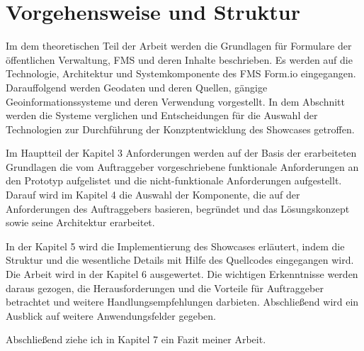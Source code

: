 \section{Vorgehensweise und Struktur}
Im dem theoretischen Teil der Arbeit werden die Grundlagen für Formulare der öffentlichen Verwaltung, FMS und deren Inhalte beschrieben. Es werden auf die Technologie, Architektur und Systemkomponente des FMS Form.io eingegangen. Darauffolgend werden Geodaten und deren Quellen, gängige Geoinformationssysteme und deren Verwendung vorgestellt. In dem Abschnitt werden die Systeme verglichen und Entscheidungen für die Auswahl der Technologien zur Durchführung der Konzptentwicklung des Showcases getroffen.

Im Hauptteil der Kapitel 3 Anforderungen werden auf der Basis der erarbeiteten Grundlagen die vom Auftraggeber vorgeschriebene funktionale Anforderungen an den Prototyp aufgelistet und die nicht-funktionale Anforderungen aufgestellt.
Darauf wird im Kapitel 4 die Auswahl der Komponente, die auf der Anforderungen des Auftraggebers basieren, begründet und das Lösungskonzept sowie seine Architektur erarbeitet.

In der Kapitel 5 wird die Implementierung des Showcases erläutert, indem die Struktur und die wesentliche Details mit Hilfe des Quellcodes eingegangen wird. Die Arbeit wird in der Kapitel 6 ausgewertet. Die wichtigen Erkenntnisse werden daraus gezogen, die Herausforderungen und die Vorteile für Auftraggeber betrachtet und weitere Handlungsempfehlungen darbieten. Abschließend wird ein Ausblick auf weitere Anwendungsfelder gegeben.

Abschließend ziehe ich in Kapitel 7 ein Fazit meiner Arbeit.


